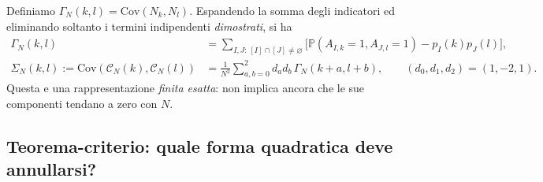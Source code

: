 \documentclass[11pt,a4paper]{article}
\begin{document}
Definiamo $\Gamma_N(k,l)=\mathrm{Cov}(N_k,N_l)$. Espandendo la somma degli indicatori ed eliminando soltanto i termini indipendenti \emph{dimostrati}, si ha
\begin{align}
\Gamma_N(k,l)&=\sum_{I,J:\,[I]\cap[J]\ne\varnothing}
\bigl[\mathbb P(A_{I,k}=1,A_{J,l}=1)-p_I(k)p_J(l)\bigr],\\
\Sigma_N(k,l):=\mathrm{Cov}(\mathcal C_N(k),\mathcal C_N(l))
&=\frac1{N^2}\sum_{a,b=0}^2 d_a d_b\,\Gamma_N(k+a,l+b),\qquad (d_0,d_1,d_2)=(1,-2,1).
\label{eq:r12ab_covariance_formula}
\end{align}
Questa e una rappresentazione \emph{finita esatta}: non implica ancora che le sue componenti tendano a zero con $N$.

\subsection{Teorema-criterio: quale forma quadratica deve annullarsi?}
\end{document}
